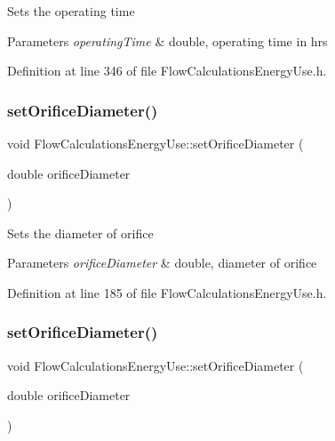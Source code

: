 Sets the operating time


\begin{DoxyParams}{Parameters}
{\em operating\+Time} & double, operating time in hrs \\
\hline
\end{DoxyParams}


Definition at line 346 of file Flow\+Calculations\+Energy\+Use.\+h.

\mbox{\label{class_flow_calculations_energy_use_a31116dc6381ad3fd9d2214da7ee3dd1b}} 
\subsubsection{\texorpdfstring{set\+Orifice\+Diameter()}{setOrificeDiameter()}\hspace{0.1cm}{\footnotesize\ttfamily [1/3]}}
{\footnotesize\ttfamily void Flow\+Calculations\+Energy\+Use\+::set\+Orifice\+Diameter (\begin{DoxyParamCaption}\item[{double}]{orifice\+Diameter }\end{DoxyParamCaption})\hspace{0.3cm}{\ttfamily [inline]}}

Sets the diameter of orifice


\begin{DoxyParams}{Parameters}
{\em orifice\+Diameter} & double, diameter of orifice \\
\hline
\end{DoxyParams}


Definition at line 185 of file Flow\+Calculations\+Energy\+Use.\+h.

\mbox{\label{class_flow_calculations_energy_use_a31116dc6381ad3fd9d2214da7ee3dd1b}} 
\subsubsection{\texorpdfstring{set\+Orifice\+Diameter()}{setOrificeDiameter()}\hspace{0.1cm}{\footnotesize\ttfamily [2/3]}}
{\footnotesize\ttfamily void Flow\+Calculations\+Energy\+Use\+::set\+Orifice\+Diameter (\begin{DoxyParamCaption}\item[{double}]{orifice\+Diameter }\end{DoxyParamCaption})\hspace{0.3cm}{\ttfamily [inline]}}

